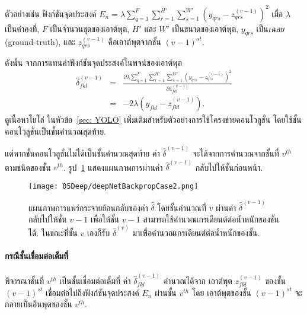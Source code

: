 ตัวอย่างเช่น ฟังก์ชันจุดประสงค์ $E_n = \lambda \sum_{q=1}^F \sum_{r=1}^{H'} \sum_{s=1}^{W'} \left( y_{qrs} - z_{qrs}^{(v-1)} \right)^2$
เมื่อ $\lambda$ เป็นค่าคงที่, $F$ เป็นจำนวนชุดของเอาต์พุต, $H'$ และ $W'$ เป็นขนาดของเอาต์พุต,
$y_{qrs}$ เป็น\textit{เฉลย} (ground-truth),
และ $z_{qrs}^{(v-1)}$ คือเอาต์พุตจากชั้น $(v-1)^{st}$.

ดังนั้น จากการแทนค่าฟังก์ชันจุดประสงค์ในพจน์ของเอาต์พุต
\begin{eqnarray}
\hat{\delta}_{fkl}^{(v-1)} &=& \frac{\partial \lambda \sum_{q=1}^F \sum_{r=1}^{H'} \sum_{s=1}^{W'} \left( y_{qrs} - z_{qrs}^{(v-1)} \right)^2}{\partial z_{fkl}^{(v-1)}} 
\nonumber \\
&=& -2 \lambda (y_{fkl} - z_{fkl}^{(v-1)})
\nonumber .
\end{eqnarray}
%
ดูเนื้อหาโยโล่ ในหัวข้อ~\ref{sec: YOLO} %
เพิ่มเติมสำหรับตัวอย่างการใช้โครงข่ายคอนโวลูชั่น โดยใช้ชั้นคอนโวลูชั่นเป็นชั้นคำนวณสุดท้าย.

แต่หากชั้นคอนโวลูชั่นไม่ได้เป็นชั้นคำนวณสุดท้าย ค่า $\hat{\delta}^{(v-1)}$ จะได้จากการคำนวณจากชั้นที่ $v^{th}$ ตามชนิดของชั้น $v^{th}$.
รูป~\ref{fig: deep layer case compute layer} แสดงแผนภาพการผ่านค่า $\hat{\delta}^{(v-1)}$ กลับไปให้ชั้นก่อนหน้า.

%
\begin{figure}
	\begin{center}
		\texttt{[image: 05Deep/deepNetBackpropCase2.png]}
		\caption[การแพร่กระจายย้อยกลับจากชั้นซ่อน]{แผนภาพการแพร่กระจายย้อนกลับของค่า $\hat{\delta}$ โดยชั้นคำนวณที่ $v$ ผ่านค่า $\hat{\delta}^{(v-1)}$ กลับไปให้ชั้น $v-1$ เพื่อให้ชั้น $v-1$ สามารถใช้คำนวณเกรเดียนต์ต่อน้ำหนักของชั้นได้.
			ในขณะที่ชั้น $v$ เองก็รับ $\hat{\delta}^{(v)}$ มาเพื่อคำนวณเกรเดียนต์ต่อน้ำหนักของชั้น.
		}
		\label{fig: deep layer case compute layer}
	\end{center}
\end{figure}
%



\paragraph{กรณีชั้นเชื่อมต่อเต็มที่}
พิจารณาชั้นที่ $v^{th}$ เป็นชั้นเชื่อมต่อเต็มที่ ค่า $\hat{\delta}_{fkl}^{(v-1)}$ คำนวณได้จาก
เอาต์พุต $z_{fkl}^{(v-1)}$ ของชั้น $(v-1)^{st}$ เชื่อมต่อไปถึงฟังก์ชันจุดประสงค์ $E_n$ ผ่านชั้น $v^{th}$ โดย
เอาต์พุตของชั้น $(v-1)^{st}$ จะกลายเป็นอินพุตของชั้น $v^{th}$.


